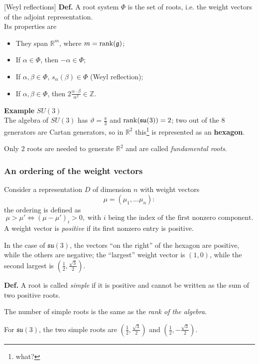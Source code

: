 
[Weyl reflections]
\textbf{Def.} A root system $\Phi $ is the set of roots, i.e. the weight vectors
of the adjoint representation.\\
Its properties are
\begin{itemize}
    \item They span $\mathbb{R}^m$, where $m=\rank(\mathfrak{g})$;
    \item If $\alpha\in\Phi $, then $-\alpha \in\Phi $;
    \item If $\alpha,\beta \in\Phi$, $s_\alpha(\beta)\in\Phi$ (Weyl reflection);
    \item If $\alpha,\beta \in\Phi $, then $2\frac{\alpha\cdot\beta}{\alpha^2}\in
        \mathbb{Z}$.
\end{itemize}
\textbf{Example} $SU(3)$\\
The algebra of $SU(3)$ has $\vartheta =\frac{\pi}{3}$ and
$\rank(\mathfrak{su}(3))=2$; two out of the 8 generators are Cartan generators, so
in $\mathbb{R}^2$ this\footnote{what?} is represented as an \textbf{hexagon}.

Only $2$ roots are needed to generate $\mathbb{R}^2$ and are called \textit{
fundamental roots}.
\subsubsection{An ordering of the weight vectors}
Consider a representation $D$ of dimension $n$ with weight vectors
\[
    \mu = (\mu_1,...\mu_n):
\]
the ordering is defined as
\[
    \mu>\mu'\iff (\mu-\mu')_i >0,\;\text{with }i\text{ being the index of the 
    first nonzero component}.
\]
A weight vector is \textit{positive} if its first nonzero entry is positive.

In the case of $\mathfrak{su}(3)$, the vectors ``on the right'' of the hexagon
are positive, while the others are negative; the ``largest'' weight vector is
$(1,0)$, while the second largest is $\left(\frac{1}{2},\frac{\sqrt{3}}{2}\right)
$.

\textbf{Def.} A root is called \textit{simple} if it is positive and cannot be
written as the sum of two positive roots.

The number of simple roots is the same as the \textit{rank of the algebra}.

For $\mathfrak{su}(3)$, the two simple roots are
$\left(\frac{1}{2},\frac{\sqrt{3}}{2}\right)$ and
$\left(\frac{1}{2},-\frac{\sqrt{3}}{2}\right)$.

